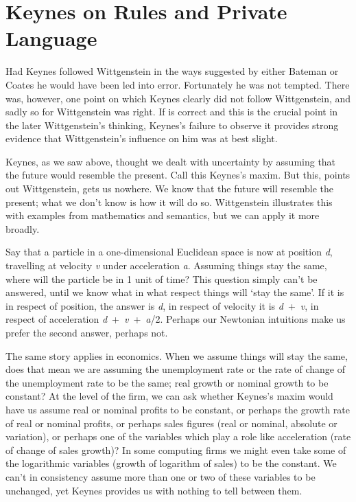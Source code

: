 \section{Keynes on Rules and Private Language}

\begin{sloppy}
Had Keynes followed Wittgenstein in the ways suggested by either Bateman or Coates he would have been led into error. Fortunately he was not tempted. There was, however, one point on which Keynes clearly did not follow Wittgenstein, and sadly so for Wittgenstein was right. If \citet{Kripke1982} is correct and this is the crucial point in the later Wittgenstein's thinking, Keynes's failure to observe it provides strong evidence that Wittgenstein's influence on him was at best slight.
\end{sloppy}

Keynes, as we saw above, thought we dealt with uncertainty by assuming that the future would resemble the present. Call this Keynes's maxim. But this, points out Wittgenstein, gets us nowhere. We know that the future will resemble the present; what we don't know is how it will do so. Wittgenstein illustrates this with examples from mathematics and semantics, but we can apply it more broadly.

Say that a particle in a one-dimensional Euclidean space is now at position \textit{d}, travelling at velocity \textit{v} under acceleration \textit{a}. Assuming things stay the same, where will the particle be in 1 unit of time? This question simply can't be answered, until we know what in what respect things will `stay the same'. If it is in respect of position, the answer is \textit{d}, in respect of velocity it is \textit{d}~+~\textit{v}, in respect of acceleration \textit{d}~+~\textit{v}~+~\textit{a}/2. Perhaps our Newtonian intuitions make us prefer the second answer, perhaps not.

The same story applies in economics. When we assume things will stay the same, does that mean we are assuming the unemployment rate or the rate of change of the unemployment rate to be the same; real growth or nominal growth to be constant? At the level of the firm, we can ask whether Keynes's maxim would have us assume real or nominal profits to be constant, or perhaps the growth rate of real or nominal profits, or perhaps sales figures (real or nominal, absolute or variation), or perhaps one of the variables which play a role like acceleration (rate of change of sales growth)? In some computing firms we might even take some of the logarithmic variables (growth of logarithm of sales) to be the constant. We can't in consistency assume more than one or two of these variables to be unchanged, yet Keynes provides us with nothing to tell between them.

